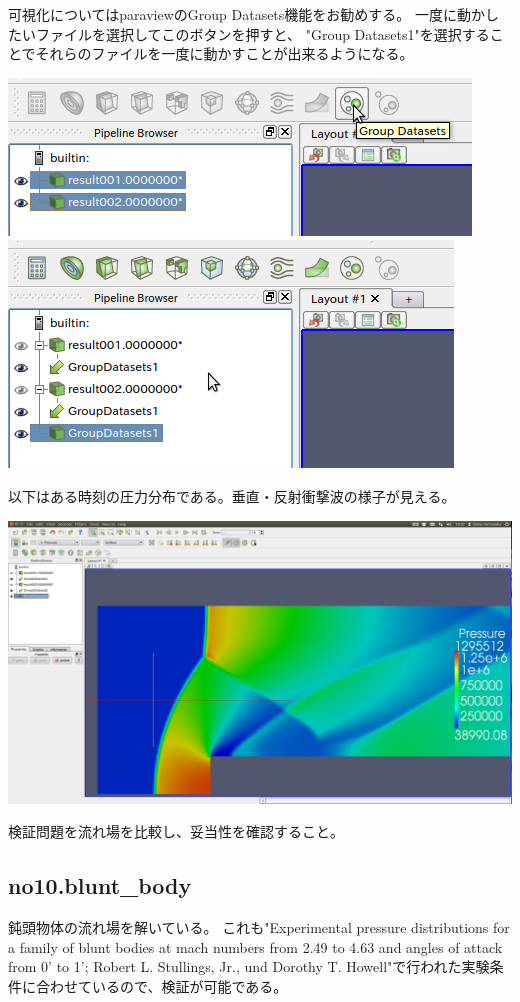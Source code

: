 \documentclass{jsarticle}
\begin{document}
可視化についてはparaviewのGroup Datasets機能をお勧めする。
一度に動かしたいファイルを選択してこのボタンを押すと、
"Group Datasets1"を選択することでそれらのファイルを一度に動かすことが出来るようになる。
\begin{center}
\includegraphics[height=.13\textheight,bb=0 0 464 158]{sample/no06.1.png}
\includegraphics[height=.13\textheight,bb=0 0 446 228]{sample/no06.2.png}
\end{center}
以下はある時刻の圧力分布である。垂直・反射衝撃波の様子が見える。
\begin{center}
\includegraphics[width=.8\textwidth,bb=0 0 1923 1080]{sample/no06.png}
\end{center}
検証問題を流れ場を比較し、妥当性を確認すること。
\subsection{no10.blunt\_body}%
鈍頭物体の流れ場を解いている。
これも"Experimental pressure distributions for a family of blunt bodies at mach numbers from 2.49 to 4.63 and angles of attack from 0' to 1'; Robert L. Stullings, Jr., und Dorothy T. Howell"で行われた実験条件に合わせているので、検証が可能である。
\end{document}
